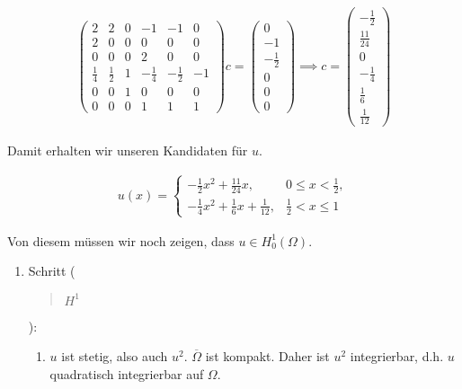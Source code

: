 \begin{solution}
\begin{align*}
  \begin{pmatrix}
    2 & 2 & 0 & -1 & -1 & 0 \\
    2 & 0 & 0 &  0 &  0 & 0 \\
    0 & 0 & 0 &  2 &  0 & 0 \\
    \frac{1}{4} & \frac{1}{2} & 1 & -\frac{1}{4} & -\frac{1}{2} & -1 \\
    0 & 0 & 1 &  0 &  0 & 0 \\
    0 & 0 & 0 &  1 &  1 & 1
  \end{pmatrix}
  c
  =
  \begin{pmatrix}
    0 \\ -1 \\ -\frac{1}{2} \\ 0 \\ 0 \\ 0
  \end{pmatrix}
  \implies
  c
  =
  \begin{pmatrix}
    -\frac{1}{2} \\ \frac{11}{24} \\ 0 \\ -\frac{1}{4} \\ \frac{1}{6} \\ \frac{1}{12}
  \end{pmatrix}
\end{align*}

Damit erhalten wir unseren Kandidaten für $u$.

\begin{align*}
  u(x)
  =
  \begin{cases}
    -\frac{1}{2} x^2 + \frac{11}{24} x,              & 0 \leq x < \frac{1}{2}, \\
    -\frac{1}{4} x^2 + \frac{1}{6} x + \frac{1}{12}, & \frac{1}{2} < x \leq 1
  \end{cases}
\end{align*}

Von diesem müssen wir noch zeigen, dass $u \in H_0^1(\Omega)$.

\begin{enumerate}[label = \arabic*.]

  \item Schritt (\blockquote{$H^1$}):

  \begin{enumerate}[label = (\roman*)]

    \item $u$ ist stetig, also auch $u^2$.
    $\overline{\Omega}$ ist kompakt.
    Daher ist $u^2$ integrierbar, d.h. $u$ quadratisch integrierbar auf $\Omega$.


\end{enumerate}
\end{enumerate}
\end{solution}
